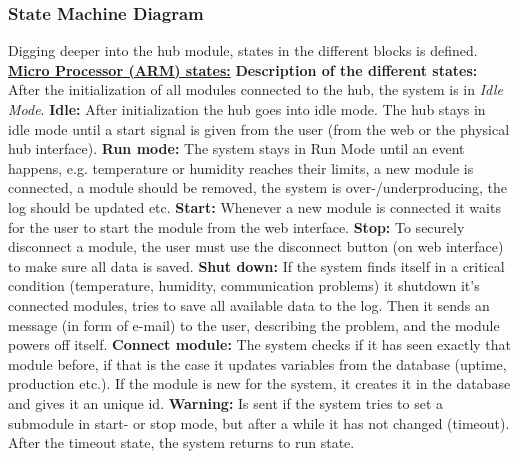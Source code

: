 \subsubsection{State Machine Diagram}
Digging deeper into the hub module, states in the different blocks is defined. 
\\[0.5cm] \underline{\textbf{Micro Processor (ARM) states:}}
\p \textbf{Description of the different states: }
	\\ After the initialization of all modules connected to the hub, the system is in  \textit{Idle Mode}.
	\p\textbf{Idle: } After initialization the hub goes into idle mode. The hub stays in idle mode until a start signal is given from the user (from the web or the physical hub interface). 
	\p\textbf{Run mode: }The system stays in Run Mode until an event happens, e.g. temperature or humidity reaches their limits, a new module is connected, a module should be removed, the system is over-/underproducing, the log should be updated etc.
	\p\textbf{Start: }Whenever a new module is connected it waits for the user to start the module from the web interface.
	\p\textbf{Stop: }To securely disconnect a module, the user must use the disconnect button (on web interface) to make sure all data is saved.
	\p\textbf{Shut down: }If the system finds itself in a critical condition (temperature, humidity, communication problems) it shutdown it's connected modules, tries to save all available data to the log. Then it sends an message (in form of e-mail) to the user, describing the problem, and the module powers off itself. 
	\p\textbf{Connect module: } The system checks if it has seen exactly that module before, if that is the case it updates variables from the database (uptime, production etc.). If the module is new for the system, it creates it in the database and gives it an unique id.
	\p\textbf{Warning: }Is sent if the system tries to set a submodule in start- or stop mode, but after a while it has not changed (timeout). After the timeout state, the system returns to run state.
